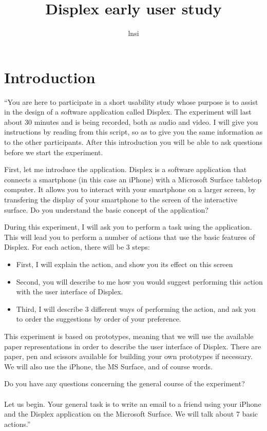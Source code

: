 \documentclass[11pt]{amsart}
\title{Displex early user study}
\author{lnsi}
\begin{document}
\maketitle

\section{Introduction}
``You are here to participate in a short usability study whose purpose is to assist in the design of a software application called Displex.
The experiment will last about 30 minutes and is being recorded, both as audio and video.
I will give you instructions by reading from this script, so as to give you the same information as to the other participants.
After this introduction you will be able to ask questions before we start the experiment.

First, let me introduce the application.
Displex is a software application that connects a smartphone (in this case an iPhone) with a Microsoft Surface tabletop computer.
It allows you to interact with your smartphone on a larger screen, by transfering the display of your smartphone to the screen of the interactive surface.
Do you understand the basic concept of the application?

During this experiment, I will ask you to perform a task using the application.
This will lead you to perform a number of actions that use the basic features of Displex.
For each action, there will be 3 steps:

\begin{itemize}
\item{First, I will explain the action, and show you its effect on this screen}
\item{Second, you will describe to me how you would suggest performing this action with the user interface of Displex.}
\item{Third, I will describe 3 different ways of performing the action, and ask you to order the suggestions by order of your preference.}
\end{itemize}

This experiment is based on prototypes, meaning that we will use the available paper representations in order to describe the user interface of Displex.
There are paper, pen and scissors available for building your own prototypes if necessary.
We will also use the iPhone, the MS Surface, and of course words.

Do you have any questions concerning the general course of the experiment?
\\\\
Let us begin.
Your general task is to write an email to a friend using your iPhone and the Displex application on the Microsoft Surface.
We will talk about 7 basic actions.''
\end{document}
